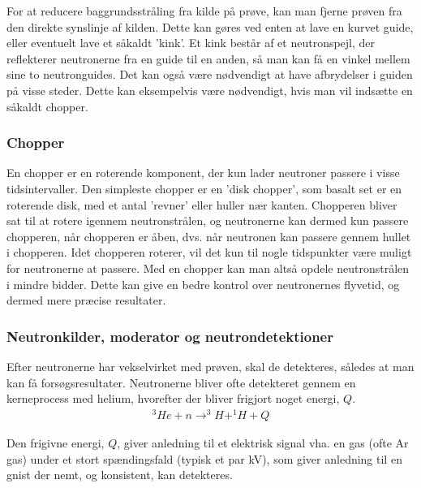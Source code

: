 \documentclass[12pt,oneside,a4paper]{article}
\begin{document}
{{{{{For at reducere baggrundsstråling fra kilde på prøve, kan man fjerne prøven fra den direkte synslinje af kilden. Dette kan gøres ved enten at lave en kurvet guide, eller eventuelt lave et såkaldt 'kink'. Et kink består af et neutronspejl, der reflekterer neutronerne fra en guide til en anden, så man kan få en vinkel mellem sine to neutronguides. 
Det kan også være nødvendigt at have afbrydelser i guiden på visse steder. Dette kan eksempelvis være nødvendigt, hvis man vil indsætte en såkaldt chopper.

\subsubsection{Chopper}
En chopper er en roterende komponent, der kun lader neutroner passere i visse tidsintervaller. Den simpleste chopper er en 'disk chopper', som basalt set er en roterende disk, med et antal 'revner' eller huller nær kanten. Chopperen bliver sat til at rotere igennem neutronstrålen, og neutronerne kan dermed kun passere chopperen, når chopperen er åben, dvs. når neutronen kan passere gennem hullet i chopperen. Idet chopperen roterer, vil det kun til nogle tidspunkter være muligt for neutronerne at passere. Med en chopper kan man altså opdele neutronstrålen i mindre bidder. Dette kan give en bedre kontrol over neutronernes flyvetid, og dermed mere præcise resultater. \cite{ess_folder}

\subsubsection{Neutronkilder, moderator og neutrondetektioner}
Efter neutronerne har vekselvirket med prøven, skal de detekteres, således at man kan få forsøgsresultater. Neutronerne 
bliver ofte detekteret gennem en kerneprocess med helium, hvorefter der bliver frigjort noget energi, $Q$. \cite{lefmann_arleth_kirkensgaard_lebech_thomsen}
\begin{align}
^3He + n \to  ^3H + ^1H + Q
\end{align}

Den frigivne energi, $Q$, giver anledning til et elektrisk signal vha. en gas (ofte Ar gas) under et stort spændingsfald (typisk et par kV), som giver anledning til en gnist der nemt, og konsistent, kan detekteres.

}}}}}
\end{document}
